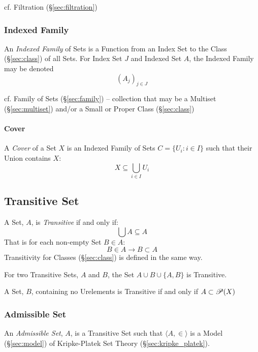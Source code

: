 \fist cf. Filtration (\S\ref{sec:filtration})



\subsubsection{Indexed Family}\label{sec:indexed_family}

An \emph{Indexed Family} of Sets is a Function from an Index Set to the Class
(\S\ref{sec:class}) of all Sets. For Index Set $J$ and Indexed Set $A$, the
Indexed Family may be denoted
\[
  (A_j)_{j \in J}
\]

\fist cf. Family of Sets (\S\ref{sec:family}) -- collection that may be a
Multiset (\S\ref{sec:multiset}) and/or a Small or Proper Class
(\S\ref{sec:class})



\paragraph{Cover}\label{sec:cover}\hfill

A \emph{Cover} of a Set $X$ is an Indexed Family of Sets $C = \{ U_i :
i \in I \}$ such that their Union contains $X$:
\[
  X \subseteq \bigcup_{i \in I} U_i
\]



\subsection{Transitive Set}\label{sec:transitive_set}

A Set, $A$, is \emph{Transitive} if and only if:
\[
  \bigcup A \subseteq A
\]
That is for each non-empty Set $B \in A$:
\[
  B \in A \to B \subset A
\]
Transitivity for Classes (\S\ref{sec:class}) is defined in the same
way.

For two Transitive Sets, $A$ and $B$, the Set $A \cup B \cup \{A,B\}$
is Transitive.

A Set, $B$, containing no Urelements is Transitive if and only if $A
\subset \mathscr{P}(X)$



\subsubsection{Admissible Set}\label{sec:admissible_set}

An \emph{Admissible Set}, $A$, is a Transitive Set such that $\langle A, \in
\rangle$ is a Model (\S\ref{sec:model}) of Kripke-Platek Set Theory
(\S\ref{sec:kripke_platek}).

